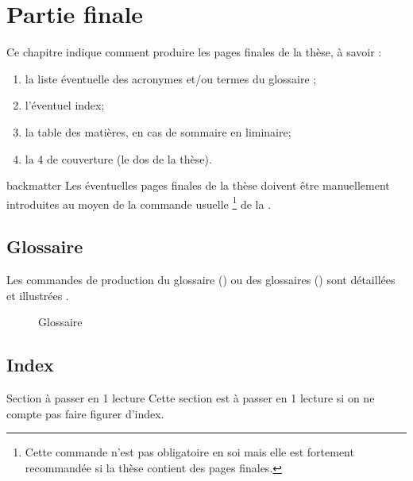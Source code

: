 \chapter{Partie finale}\label{cha-pages-finales}
%

Ce chapitre indique comment produire les pages finales de la thèse,
à savoir :
\begin{enumerate}
\item la liste éventuelle des acronymes et/ou
  termes du glossaire ;
\item l'éventuel index;
\item la table des matières, en cas de sommaire en \gls{liminaire};
\item la 4\ieme{} de couverture (le dos de la thèse).
\end{enumerate}

\begin{docCommand}{backmatter}{}
  Les éventuelles pages finales de la thèse doivent être manuellement
  introduites au moyen de la commande usuelle
  \footnote{Cette commande n'est pas obligatoire en
    soi mais elle est fortement recommandée si la thèse contient des pages
    finales.} de la \nofrontmatter.
\end{docCommand}

\section{Glossaire}
%

Les commandes de production du glossaire () ou
des glossaires () sont détaillées et illustrées
.

\begin{figure}[htbp]
  \centering
  \caption{Glossaire}
  \label{fig-printglossary}
\end{figure}

\section{Index}
%

\begin{dbremark*}{Section à passer en 1\iere{} lecture}
  Cette section est à passer en 1\iere{} lecture si on ne compte pas faire
  figurer d'index.
\end{dbremark*}

